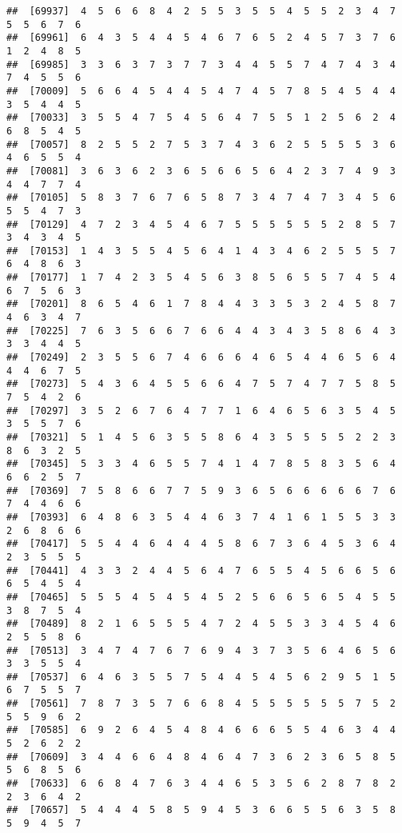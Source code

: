 \documentclass[
]{book}
\begin{document}
\begin{verbatim}
##  [69937]  4  5  6  6  8  4  2  5  5  3  5  5  4  5  5  2  3  4  7  5  5  6  7  6
##  [69961]  6  4  3  5  4  4  5  4  6  7  6  5  2  4  5  7  3  7  6  1  2  4  8  5
##  [69985]  3  3  6  3  7  3  7  7  3  4  4  5  5  7  4  7  4  3  4  7  4  5  5  6
##  [70009]  5  6  6  4  5  4  4  5  4  7  4  5  7  8  5  4  5  4  4  3  5  4  4  5
##  [70033]  3  5  5  4  7  5  4  5  6  4  7  5  5  1  2  5  6  2  4  6  8  5  4  5
##  [70057]  8  2  5  5  2  7  5  3  7  4  3  6  2  5  5  5  5  3  6  4  6  5  5  4
##  [70081]  3  6  3  6  2  3  6  5  6  6  5  6  4  2  3  7  4  9  3  4  4  7  7  4
##  [70105]  5  8  3  7  6  7  6  5  8  7  3  4  7  4  7  3  4  5  6  5  5  4  7  3
##  [70129]  4  7  2  3  4  5  4  6  7  5  5  5  5  5  5  2  8  5  7  3  4  3  4  5
##  [70153]  1  4  3  5  5  4  5  6  4  1  4  3  4  6  2  5  5  5  7  6  4  8  6  3
##  [70177]  1  7  4  2  3  5  4  5  6  3  8  5  6  5  5  7  4  5  4  6  7  5  6  3
##  [70201]  8  6  5  4  6  1  7  8  4  4  3  3  5  3  2  4  5  8  7  4  6  3  4  7
##  [70225]  7  6  3  5  6  6  7  6  6  4  4  3  4  3  5  8  6  4  3  3  3  4  4  5
##  [70249]  2  3  5  5  6  7  4  6  6  6  4  6  5  4  4  6  5  6  4  4  4  6  7  5
##  [70273]  5  4  3  6  4  5  5  6  6  4  7  5  7  4  7  7  5  8  5  7  5  4  2  6
##  [70297]  3  5  2  6  7  6  4  7  7  1  6  4  6  5  6  3  5  4  5  3  5  5  7  6
##  [70321]  5  1  4  5  6  3  5  5  8  6  4  3  5  5  5  5  2  2  3  8  6  3  2  5
##  [70345]  5  3  3  4  6  5  5  7  4  1  4  7  8  5  8  3  5  6  4  6  6  2  5  7
##  [70369]  7  5  8  6  6  7  7  5  9  3  6  5  6  6  6  6  6  7  6  7  4  4  6  6
##  [70393]  6  4  8  6  3  5  4  4  6  3  7  4  1  6  1  5  5  3  3  2  6  8  6  6
##  [70417]  5  5  4  4  6  4  4  4  5  8  6  7  3  6  4  5  3  6  4  2  3  5  5  5
##  [70441]  4  3  3  2  4  4  5  6  4  7  6  5  5  4  5  6  6  5  6  6  5  4  5  4
##  [70465]  5  5  5  4  5  4  5  4  5  2  5  6  6  5  6  5  4  5  5  3  8  7  5  4
##  [70489]  8  2  1  6  5  5  5  4  7  2  4  5  5  3  3  4  5  4  6  2  5  5  8  6
##  [70513]  3  4  7  4  7  6  7  6  9  4  3  7  3  5  6  4  6  5  6  3  3  5  5  4
##  [70537]  6  4  6  3  5  5  7  5  4  4  5  4  5  6  2  9  5  1  5  6  7  5  5  7
##  [70561]  7  8  7  3  5  7  6  6  8  4  5  5  5  5  5  5  7  5  2  5  5  9  6  2
##  [70585]  6  9  2  6  4  5  4  8  4  6  6  6  5  5  4  6  3  4  4  5  2  6  2  2
##  [70609]  3  4  4  6  6  4  8  4  6  4  7  3  6  2  3  6  5  8  5  5  6  8  5  6
##  [70633]  6  6  8  4  7  6  3  4  4  6  5  3  5  6  2  8  7  8  2  2  3  6  4  2
##  [70657]  5  4  4  4  5  8  5  9  4  5  3  6  6  5  5  6  3  5  8  5  9  4  5  7

\end{verbatim}
\end{document}
